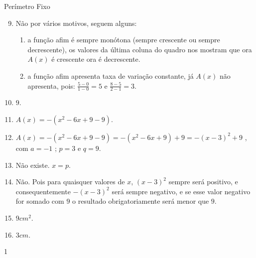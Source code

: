 \clearmargin
\begin{answer}{Perímetro Fixo}
{
\begin{enumerate}\setcounter{enumi}{8}
\item {} 
Não por vários motivos, seguem alguns:

\begin{enumerate}[label=\arabic*)]
\item a função afim é sempre monótona (sempre crescente ou sempre decrescente), os valores da última coluna do quadro nos mostram que ora \(A(x)\) é crescente ora é decrescente.

\item a função afim apresenta taxa de variação constante, já \(A(x)\) não apresenta, pois: \(\frac{5-0}{1-0}=5\) e \(\frac{8-5}{2-1}=3\).
\end{enumerate}

\item {} 
\(9\).

\item {} 
\(A(x)=-(x^2-6x+9-9)\).

\item {} 
\(A(x)=-(x^2-6x+9-9)=-(x^2-6x+9)+9=-(x-3)^2+9\) , com \(a=-1\) ; \(p=3\) e \(q=9\).

\item {} 
Não existe. \(x=p\).

\item {} 
Não. Pois para quaisquer valores de \(x\), \((x-3)^2\) sempre será positivo, e consequentemente \(-(x-3)^2\) será sempre negativo, e se esse valor negativo for somado com \(9\) o resultado obrigatoriamente será menor que \(9\).

\item {} 
\(9cm^2\).

\item {} 
\(3cm\).

\end{enumerate}
}{1}
\end{answer}

